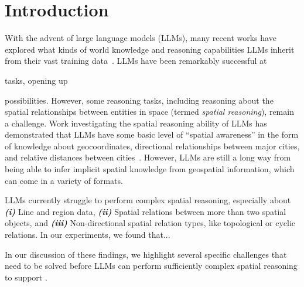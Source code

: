 \section{Introduction}

\label{section:introduction}

With the advent of large language models (LLMs), many recent works have explored what kinds of world knowledge and reasoning capabilities LLMs inherit from their vast training data~\cite{Mai2023, Bhandari2023, Qi2023}.
%
LLMs have been remarkably successful at 

tasks, opening up 


possibilities.
%
However, some reasoning tasks, including reasoning about the spatial relationships between entities in space (termed \textit{spatial reasoning}), remain a challenge.
%
%
Work investigating the spatial reasoning ability of LLMs has demonstrated that LLMs have some basic level of ``spatial awareness'' in the form of knowledge about geocoordinates, directional relationships between major cities, and relative distances between cities~\cite{Bhandari2023, Qi2023}.
However, LLMs are still a long way from being able to infer implicit spatial knowledge from geospatial information, which can come in a variety of formats.


LLMs currently struggle to perform complex spatial reasoning, especially about
%
\textit{\textbf{(i)}} Line and region data,
\textit{\textbf{(ii)}} Spatial relations between more than two spatial objects, and 
\textit{\textbf{(iii)}} Non-directional spatial relation types, like topological or cyclic relations.
%
In our experiments, we found that... 


In our discussion of these findings, we highlight several specific challenges that need to be solved before LLMs can perform sufficiently complex spatial reasoning to support .


